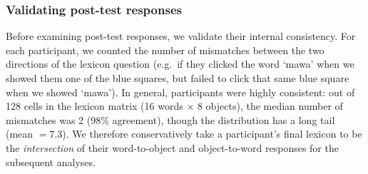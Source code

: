 %
%

\subsubsection{Validating post-test responses}

Before examining post-test responses, we validate their internal consistency.
For each participant, we counted the number of mismatches between the two directions of the lexicon question (e.g.\ if they clicked the word `mawa' when we showed them one of the blue squares, but failed to click that same blue square when we showed `mawa'). 
In general, participants were highly consistent: out of 128 cells in the lexicon matrix (16 words $\times$ 8 objects), the median number of mismatches was 2 (98\% agreement), though the distribution has a long tail (mean $= 7.3$). 
We therefore conservatively take a participant's final lexicon to be the \emph{intersection} of their word-to-object and object-to-word responses for the subsequent analyses.


